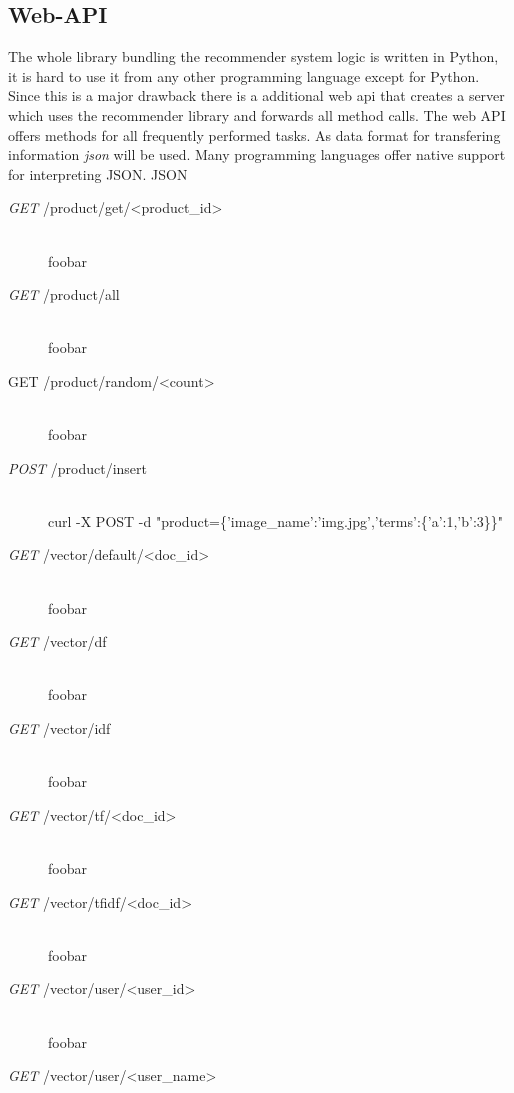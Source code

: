 

\subsection{Web-API}
The whole library bundling the recommender system logic is written in Python, it is hard to use it from any other programming language except for Python.
Since this is a major drawback there is a additional \gls{web api} that creates a server which uses the recommender library and forwards all method calls.
The web API offers methods for all frequently performed tasks.
As data format for transfering information \textit{\gls{json}} will be used.
Many programming languages offer native support for interpreting JSON.
{\color{red}JSON}

\begin{description}
    \item[\textit{GET} /product/get/\textless product\_id\textgreater]\hfill\\
        foobar
    \item[\textit{GET} /product/all]\hfill\\
        foobar
    \item[GET /product/random/\textless count\textgreater]\hfill\\
        foobar
    \item[\textit{POST} /product/insert]\hfill\\
        curl -X POST -d "product=\{'image\_name':'img.jpg','terms':\{'a':1,'b':3\}\}"
    \item[\textit{GET} /vector/default/\textless doc\_id\textgreater]\hfill\\
        foobar
    \item[\textit{GET} /vector/df]\hfill\\
        foobar
    \item[\textit{GET} /vector/idf]\hfill\\
        foobar
    \item[\textit{GET} /vector/tf/\textless doc\_id\textgreater]\hfill\\
        foobar
    \item[\textit{GET} /vector/tfidf/\textless doc\_id\textgreater]\hfill\\
        foobar
    \item[\textit{GET} /vector/user/\textless user\_id\textgreater]\hfill\\
        foobar
    \item[\textit{GET} /vector/user/\textless user\_name\textgreater]\hfill\\

\end{description}
